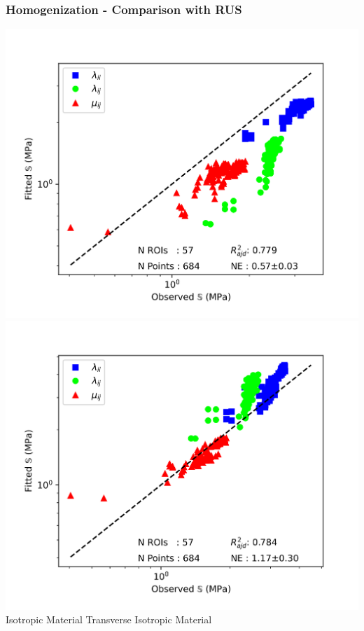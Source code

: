 \documentclass[xcolor=table,11pt]{beamer}
\begin{document}
	\begin{frame}
		\frametitle{Homogenization - Comparison with RUS}
		\vfill
		\hfill \includegraphics[width=0.4\linewidth]{05_Homogenization/Plots/Elasticity_IsoRUS}
		\hfill \includegraphics[width=0.4\linewidth]{05_Homogenization/Plots/Elasticity_TraRUS}
		\hfill\\
		\hfill Isotropic Material \hfill Transverse Isotropic Material \hfill\\
		\vfill
	\end{frame}
		
\end{document}
